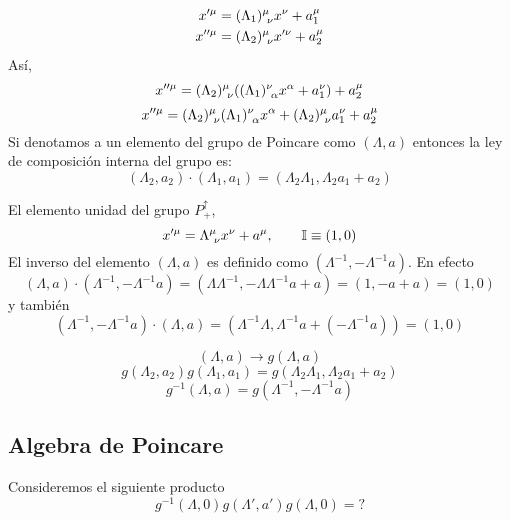 \begin{align}
  x'^\mu &=(\Lambda_1)^\mu _{~\nu } x^\nu +a_1^\mu\\
  x''^\mu &=(\Lambda_2)^\mu _{~\nu } x'^\nu +a_2^\mu
\end{align}
Así, 
\begin{equation}
 x''^\mu = (\Lambda_2)^\mu_{~\nu }((\Lambda_1)^\nu_{~\alpha} x^\alpha +a_1^\nu )+a_2^\mu 
\end{equation}
\begin{equation}
  x''^\mu =(\Lambda_2)^\mu_{~\nu }(\Lambda_1)^\nu_{~\alpha }x^\alpha +(\Lambda_2)^\mu_{~\nu }a_1^\nu +a_2^\mu 
\end{equation}
Si denotamos a un elemento del grupo de Poincare como $(\Lambda,a)$ entonces la ley de composición interna del grupo es:
\begin{equation}
  \boxed{(\Lambda_2,a_2)\cdot (\Lambda_1,a_1)=(\Lambda_2\Lambda_1,\Lambda_2a_1+a_2)}
\end{equation}

El elemento unidad del grupo $P_+^\uparrow$,
\begin{equation}
  x'^\mu =\Lambda^\mu_{~\nu } x^\nu+ a^\mu ,\qquad \mathbb{I}\equiv (1,0)
\end{equation}
El inverso del elemento $(\Lambda,a)$ es definido como $(\Lambda^{-1},-\Lambda^{-1}a)$. En efecto
\begin{equation}
  (\Lambda,a)\cdot (\Lambda^{-1},-\Lambda^{-1}a)=(\Lambda\Lambda^{-1},-\Lambda\Lambda^{-1}a+a)=(1,-a+a)=(1,0)
\end{equation}
y también
\begin{equation}
  (\Lambda^{-1},-\Lambda^{-1}a)\cdot (\Lambda,a)=(\Lambda^{-1}\Lambda,\Lambda^{-1}a+(-\Lambda^{-1}a))=(1,0)
\end{equation}


\begin{equation}
  (\Lambda,a)\to g(\Lambda,a)
\end{equation}
\begin{equation}
  g(\Lambda_2,a_2)g(\Lambda_1,a_1)=g(\Lambda_2\Lambda_1,\Lambda_2a_1+a_2)
\end{equation}
\begin{equation}
  g^{-1}(\Lambda,a)=g(\Lambda^{-1},-\Lambda^{-1}a)
\end{equation}

\subsection{Algebra de Poincare}
Consideremos el siguiente producto
\begin{equation}
  g^{-1}(\Lambda,0)g(\Lambda',a')g(\Lambda,0)=?
\end{equation}























